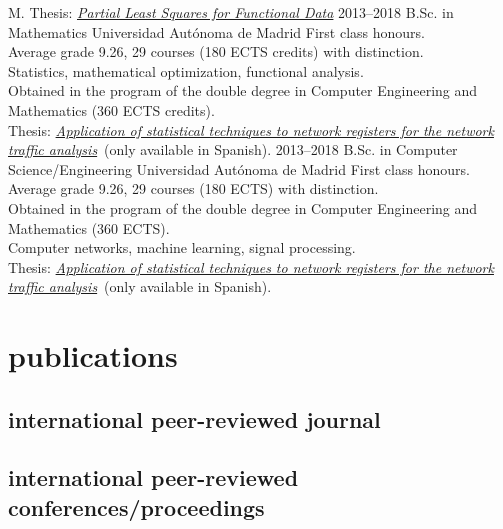 \documentclass[]{friggeri-cv}
\newcommand{\tfg}[0]{\href{https://repositorio.uam.es/bitstream/handle/10486/688211/perdices_burrero_daniel_tfg.pdf?sequence=1&isAllowed=y}{\emph{Application of statistical techniques to network registers for the network traffic analysis}}}
\begin{document}
\begin{entrylist}
{    M. Thesis: \href{https://dperdices.github.io/resources/Partial_Least_Squares_for_Functional_Data.pdf}{\emph{Partial Least Squares for Functional Data}}
    }
\entry
    {2013–2018}
    {B.Sc. in Mathematics}
    {Universidad Autónoma de Madrid}
    {First class honours.\\
    Average grade 9.26, 29 courses  (180 ECTS credits) with distinction. \\
    Statistics, mathematical optimization, functional analysis.\\
    Obtained in the program of the double degree in Computer Engineering and Mathematics (360 ECTS credits).\\
    Thesis: \tfg~(only available in Spanish).
    }
\entry
    {2013–2018}
    {B.Sc. in Computer Science/Engineering}
    {Universidad Autónoma de Madrid}
    {First class honours.\\
    Average grade 9.26, 29 courses  (180 ECTS) with distinction. \\
    Obtained in the program of the double degree in Computer Engineering and Mathematics (360 ECTS).\\
    Computer networks, machine learning, signal processing.\\
    Thesis: \tfg~(only available in Spanish).}
\end{entrylist}
\newpage
\section{publications}

\nocite{*}
\subsection{international peer-reviewed journal}
\begin{refsegment}
  \nocite{*}
  \printbibliography[sorting=chronological, type=article, notkeyword={spanish}, heading=none]
\end{refsegment}
\subsection{international peer-reviewed conferences/proceedings}
\begin{refsegment}
  \nocite{*}
  \printbibliography[sorting=chronological, type=inproceedings, notkeyword={spanish}, heading=none]
\end{refsegment}
\end{document}
